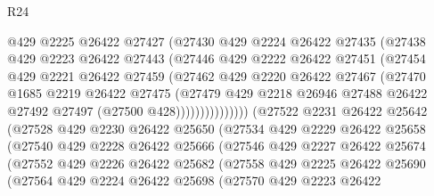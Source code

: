 \begin{lexlean}{R24}
\begin{coremodule}
                      @429
                      @2225
                      @26422
                      @27427
                      (@27430
                        @429
                        @2224
                        @26422
                        @27435
                        (@27438
                          @429
                          @2223
                          @26422
                          @27443
                          (@27446
                            @429
                            @2222
                            @26422
                            @27451
                            (@27454
                              @429
                              @2221
                              @26422
                              @27459
                              (@27462
                                @429
                                @2220
                                @26422
                                @27467
                                (@27470
                                  @1685
                                  @2219
                                  @26422
                                  @27475
                                  (@27479
                                    @429
                                    @2218
                                    @26946
                                    @27488
                                    @26422
                                    @27492
                                    @27497
                                    (@27500 @428)))))))))))))))
        (@27522
          @2231
          @26422
          @25642
          (@27528
            @429
            @2230
            @26422
            @25650
            (@27534
              @429
              @2229
              @26422
              @25658
              (@27540
                @429
                @2228
                @26422
                @25666
                (@27546
                  @429
                  @2227
                  @26422
                  @25674
                  (@27552
                    @429
                    @2226
                    @26422
                    @25682
                    (@27558
                      @429
                      @2225
                      @26422
                      @25690
                      (@27564
                        @429
                        @2224
                        @26422
                        @25698
                        (@27570
                          @429
                          @2223
                          @26422

\end{coremodule}
\end{lexlean}
